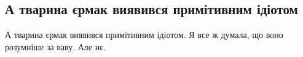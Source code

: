  
 
 
 
 
\subsection{А тварина єрмак виявився примітивним ідіотом}

А тварина єрмак виявився примітивним ідіотом. Я все ж думала, що воно розумніше
за ваву. Але нє.
